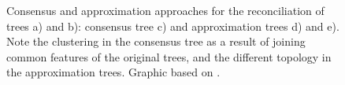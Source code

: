 \begin{figure}[t]
	\centering
	\def\svgwidth{0.8\textwidth}
	
	\caption[Consensus and approximation trees]{
		Consensus and approximation approaches for the reconciliation of trees a)
		and b): consensus tree c) and approximation trees d) and e). Note the
		clustering in the consensus tree as a result of joining common features of
		the original trees, and the different topology in the approximation trees.
		Graphic based on \cite{mirkin1995}.
	}
	\label{fig:consens-approx}
\end{figure}
